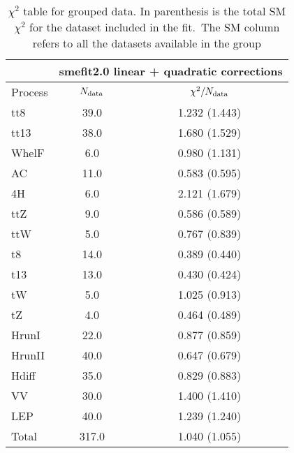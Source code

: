 \documentclass{article}
\begin{document}
\begin{table}[H]
\centering
\begin{tabular}{|l|c|c|}
\hline
& \multicolumn{2}{c|}{smefit2.0 linear + quadratic corrections}\\ \hline
Process  & $N_{\rm data}$ & $\chi^2/N_{\rm data}$\\ \hline
tt8 & 39.0                         & 1.232                             (1.443) \\ \hline
tt13 & 38.0                         & 1.680                             (1.529) \\ \hline
WhelF & 6.0                         & 0.980                             (1.131) \\ \hline
AC & 11.0                         & 0.583                             (0.595) \\ \hline
4H & 6.0                         & 2.121                             (1.679) \\ \hline
ttZ & 9.0                         & 0.586                             (0.589) \\ \hline
ttW & 5.0                         & 0.767                             (0.839) \\ \hline
t8 & 14.0                         & 0.389                             (0.440) \\ \hline
t13 & 13.0                         & 0.430                             (0.424) \\ \hline
tW & 5.0                         & 1.025                             (0.913) \\ \hline
tZ & 4.0                         & 0.464                             (0.489) \\ \hline
HrunI & 22.0                         & 0.877                             (0.859) \\ \hline
HrunII & 40.0                         & 0.647                             (0.679) \\ \hline
Hdiff & 35.0                         & 0.829                             (0.883) \\ \hline
VV & 30.0                         & 1.400                             (1.410) \\ \hline
LEP & 40.0                         & 1.239                             (1.240) \\ \hline
 \hline Total & 317.0                 & 1.040                     (1.055) \\ \hline
\end{tabular}
\caption{$\chi^2$ table for grouped data. In parenthesis is the total SM $\chi^2$ for the dataset included in the fit.\
                    The SM column refers to all the datasets available in the group}
\end{table}
\end{document}

